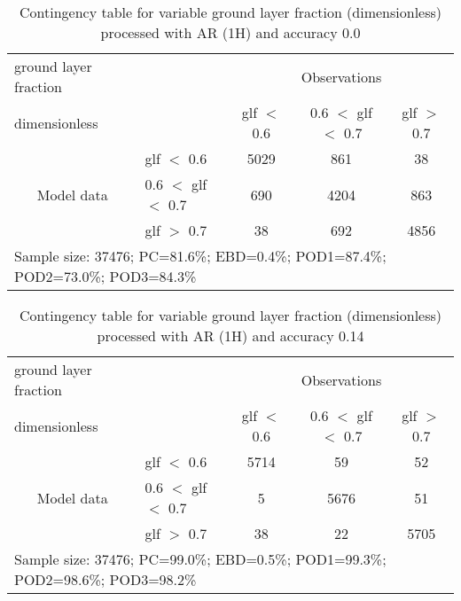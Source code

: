 \documentclass[11pt,english]{article}
\begin{document}
\begin{table}[]
\begin{center}
\begin{tabular}{llccc}
\hline
{ground layer fraction}                                       &                                                    & \multicolumn{3}{c}{Observations}                 \\
{dimensionless}                                       &                             & glf $<$ 0.6   & 0.6 $<$ glf $<$ 0.7 & glf $>$ 0.7 \\
\hline
\multicolumn{1}{c}{\multirow{3}{*}{Model data}}  & glf $<$ 0.6             & 5029                & 861                       & 38              \\
                                                 & 0.6  $<$ glf $<$ 0.7 & 690                & 4204                       & 863              \\
                                                 & glf $>$ 0.7             & 38                & 692                       & 4856              \\
\hline
\multicolumn{5}{l}{Sample size: 37476; PC=81.6\%; EBD=0.4\%; POD1=87.4\%; POD2=73.0\%; POD3=84.3\%}
\end{tabular}
\end{center}
\caption{Contingency table for variable ground layer fraction (dimensionless) processed with AR (1H) and accuracy 0.0}
\label{tab:contingencyglfAFT}
\end{table}
\begin{table}[]
\begin{center}
\begin{tabular}{llccc}
\hline
{ground layer fraction}                                       &                                                    & \multicolumn{3}{c}{Observations}                 \\
{dimensionless}                                       &                             & glf $<$ 0.6   & 0.6 $<$ glf $<$ 0.7 & glf $>$ 0.7 \\
\hline
\multicolumn{1}{c}{\multirow{3}{*}{Model data}}  & glf $<$ 0.6             & 5714                & 59                       & 52              \\
                                                 & 0.6  $<$ glf $<$ 0.7 & 5                & 5676                       & 51              \\
                                                 & glf $>$ 0.7             & 38                & 22                       & 5705              \\
\hline
\multicolumn{5}{l}{Sample size: 37476; PC=99.0\%; EBD=0.5\%; POD1=99.3\%; POD2=98.6\%; POD3=98.2\%}
\end{tabular}
\end{center}
\caption{Contingency table for variable ground layer fraction (dimensionless) processed with AR (1H) and accuracy 0.14}
\label{tab:contingencyglfAFT}
\end{table}
\end{document}
